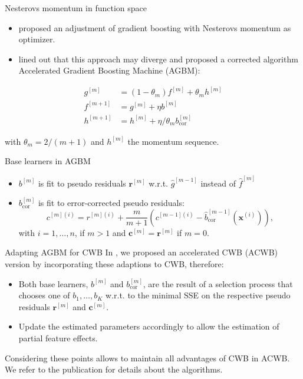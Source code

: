\documentclass[ignorenonframetext,]{beamer}
\providecommand{\tightlist}{%
  \setlength{\itemsep}{0pt}\setlength{\parskip}{0pt}}
\newcommand{\fh}{\hat{f}}
\newcommand{\fmh}{\fh^{[m]}}
\newcommand{\xv}{\bm{x}}
\newcommand{\pr}{r}
\newcommand{\prv}{\bm{r}}
\newcommand{\rmi}{\pr^{[m](i)}}
\renewcommand{\xi}[1][i]{\xv^{(#1)}}
\newcommand{\rmm}{\prv^{[m]}}
\begin{document}
\begin{frame}{Nesterovs momentum in function space}
\protect\hypertarget{nesterovs-momentum-in-function-space}{}
\begin{itemize}
\tightlist
\item
  \citet{biau2019accelerated} proposed an adjustment of gradient
  boosting with Nesterovs momentum as optimizer.
\item
  \citet{lu2020accelerating} lined out that this approach may diverge
  and proposed a corrected algorithm Accelerated Gradient Boosting
  Machine (AGBM):
\end{itemize}

\vspace{-0.9cm}
\begin{align*}
g^{[m]} &= (1 - \theta_m) f^{[m]} + \theta_m h^{[m]}\\
f^{[m+1]} &= g^{[m]} + \eta b^{[m]} \\
h^{[m+1]} &= h^{[m]} + \eta / \theta_m b^{[m]}_{\text{cor}}
\end{align*}

with \(\theta_m = 2 / (m + 1)\) and \(h^{[m]}\) the momentum sequence.
\end{frame}

\begin{frame}{Base learners in AGBM}
\protect\hypertarget{base-learners-in-agbm}{}
\begin{itemize}
\tightlist
\item
  \(b^{[m]}\) is fit to pseudo residuals \(\rmm\) w.r.t.
  \(\hat{g}^{[m-1]}\) instead of \(\fmh\)
\item
  \(b^{[m]}_{\text{cor}}\) is fit to error-corrected pseudo residuals:
  \[c^{[m](i)} = \rmi + \frac{m}{m+1}(c^{[m-1](i)} - \hat{b}_{\text{cor}}^{[m-1]}(\xi)),\]
  with \(i = 1, \dots, n\), if \(m > 1\) and \(\bm{c}^{[m]} = \rmm\) if
  \(m = 0\).
\end{itemize}
\end{frame}

\begin{frame}{Adapting AGBM for CWB}
\protect\hypertarget{adapting-agbm-for-cwb}{}
In \citet{schalk2022accelerated}, we proposed an accelerated CWB (ACWB)
version by incorporating these adaptions to CWB, therefore:

\begin{itemize}
\tightlist
\item
  Both base learners, \(b^{[m]}\) and \(b^{[m]}_{\text{cor}}\), are the
  result of a selection process that chooses one of \(b_1, \dots, b_K\)
  w.r.t. to the minimal SSE on the respective pseudo residuals \(\rmm\)
  and \(\bm{c}^{[m]}\).
\item
  Update the estimated parameters accordingly to allow the estimation of
  partial feature effects.
\end{itemize}

Considering these points allows to maintain all advantages of CWB in
ACWB. We refer to the publication for details about the algorithms.
\end{frame}
\end{document}
